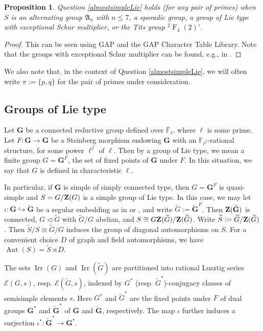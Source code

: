 \documentclass[12pt,leqno,a4paper]{amsart}
\newcommand{\FF}{{\mathbb{F}}}
\newcommand{\bG}{{\mathbf{G}}}
\newcommand{\Irr}{{\operatorname{Irr}}}
\newcommand{\alt}{\mathfrak{A}}
\newcommand{\tw}[1]{{}^#1\!}
\def\zent#1{{\bf Z}(#1)}
\newtheorem{prop}[thm]{Proposition}
\theoremstyle{remark}
\newcommand\wt[1]{\widetilde{#1}}
\newcommand{\aut}{\operatorname{Aut}}
\newcommand\type[1]{\operatorname{#1}}
\begin{document}
\begin{prop}\label{prop:sporadicexceptschur}
Question \ref{almostsimpleLie} holds (for any pair of primes) when $S$ is an alternating group $\alt_n$ with $n\leq 7$, a sporadic group, a group of Lie type with exceptional Schur multiplier, or the Tits group $\tw{2}\type{F}_4(2)'$.
\end{prop}
\begin{proof}
This can be seen using GAP and the GAP Character Table Library. Note that the groups with exceptional Schur multiplier can be found, e.g., in \cite[Table 6.1.3]{GLS3}.
\end{proof}

We also note that, in the context of Question \ref{almostsimpleLie}, we will often write $\pi:=\{p,q\}$ for the pair of primes under consideration. 

\subsection{Groups of Lie type}
Let $\bG$ be a connected reductive group defined over $\overline{\FF}_\ell$, where $\ell$ is some prime.  Let $F\colon \bG\rightarrow\bG$ be a Steinberg morphism endowing $\bG$ with an $\FF_{\ell^f}$-rational structure, for some power $\ell^f$ of $\ell$.  Then by a group of Lie type, we mean a finite group $G=\bG^F$, the set of fixed points of $\bG$ under $F$.  In this situation, we say that $G$ is defined in characteristic $\ell$.  

In particular, if $\bG$ is simple of simply connected type, then $G=\bG^F$ is  quasi-simple and $S=G/\zent{G}$ is a simple group of Lie type. In this case, we may let $\iota\colon\bG\hookrightarrow \wt{\bG}$ be a regular embedding as in \cite[Proposition 1.7.5]{GM20}  or \cite[(15.1)]{CE04}, 
and write $\wt{G}:=\wt{\bG}^F$.  Then $\zent{\wt{\bG}}$ is connected, $G\lhd \wt{G}$ with $\wt{G}/G$ abelian, and $S\cong G\zent{\wt{G}}/\zent{\wt{G}}$.   Write $\wt{S}:=\wt{G}/\zent{\wt{G}}$.  Then $\wt{S}/S\cong \wt{G}/G$ induces the group of diagonal automorphisms on $S$.  For a convenient choice $D$ of graph and field automorphisms, we have $\aut(S)=\wt{S}\rtimes D$.

The sets $\Irr(G)$ and $\Irr(\wt{G})$ are partitioned into rational Lusztig series $\mathcal{E}(G, s)$, resp. $\mathcal{E}(\wt{G}, s)$, indexed by $G^\ast$ (resp. $\wt{G}^\ast$)-conjugacy classes of semisimple elements $s$.   Here $G^\ast$ and $\wt{G}^\ast$ are the fixed points under $F$ of dual groups $\bG^\ast$ and $ \wt{\bG}^\ast$ of $\bG$ and $\wt{\bG}$, respectively.  The map $\iota$ further induces a surjection $\iota^\ast\colon \wt{\bG}^\ast\rightarrow\bG^\ast$.
\end{document}
